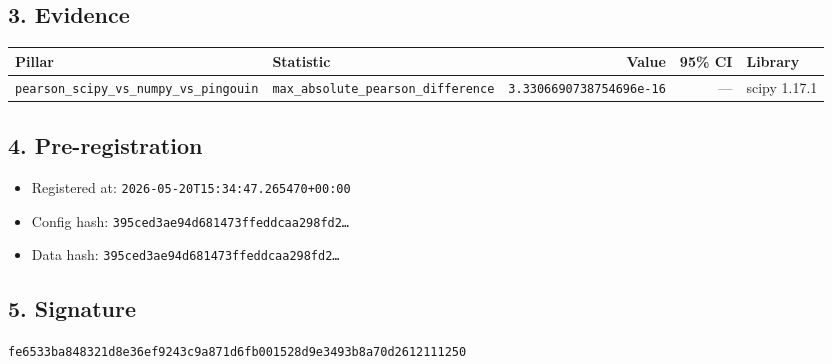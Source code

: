 \documentclass{article}
\begin{document}
\subsection*{3. Evidence}
\begin{tabular}{llrrl}\toprule
\textbf{Pillar} & \textbf{Statistic} & \textbf{Value} & \textbf{95\% CI} & \textbf{Library} \\\midrule
\texttt{pearson\_scipy\_vs\_numpy\_vs\_pingouin} & \texttt{max\_absolute\_pearson\_difference} & \texttt{3.3306690738754696e-16} & --- & scipy 1.17.1 \\
\bottomrule\end{tabular}
\subsection*{4. Pre-registration}
\begin{itemize}
\item Registered at: \texttt{2026-05-20T15:34:47.265470+00:00}
\item Config hash: \texttt{395ced3ae94d681473ffeddcaa298fd2\dots}
\item Data hash: \texttt{395ced3ae94d681473ffeddcaa298fd2\dots}
\end{itemize}
\subsection*{5. Signature}
\texttt{fe6533ba848321d8e36ef9243c9a871d6fb001528d9e3493b8a70d2612111250}\\
\end{document}
